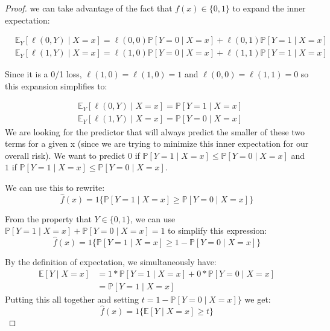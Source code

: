 \begin{proof}


 we can take advantage of the fact that $f(x) \in \{0, 1\}$ to expand the inner expectation:


$$\begin{aligned}
&\mathbb{E}_Y[\ell(0, Y) \mid X=x]=\ell(0,0) \mathbb{P}[Y=0 \mid X=x]+\ell(0,1) \mathbb{P}[Y=1 \mid X=x] \\
&\mathbb{E}_Y[\ell(1, Y) \mid X=x]=\ell(1,0) \mathbb{P}[Y=0 \mid X=x]+\ell(1,1) \mathbb{P}[Y=1 \mid X=x]
\end{aligned}
$$

\noindent
Since it is a 0/1 loss, $\ell(1,0) = \ell(1,0) = 1$ and $\ell(0,0) = \ell(1,1) = 0$ so this expansion simplifies to:

$$\begin{aligned}
&\mathbb{E}_Y[\ell(0, Y) \mid X=x]= \mathbb{P}[Y=1 \mid X=x] \\
&\mathbb{E}_Y[\ell(1, Y) \mid X=x]=\mathbb{P}[Y=0 \mid X=x]
\end{aligned}
$$
We are looking for the predictor that will always predict the smaller of these two terms for a given x (since we are trying to minimize this inner expectation for our overall risk). We want to predict $0$ if $\mathbb{P}[Y=1 \mid X=x] \leq \mathbb{P}[Y=0 \mid X=x]$ and $1$ if $\mathbb{P}[Y=1 \mid X=x] \leq \mathbb{P}[Y=0 \mid X=x]$.

\noindent
We can use this to rewrite:
$$\hat{f}(x) = 1\{\mathbb{P}[Y=1 \mid X=x] \geq \mathbb{P}[Y=0 \mid X=x]\}$$

\noindent
From the property that $Y \in \{0, 1\}$, we can use $\mathbb{P}[Y=1 \mid X=x] + \mathbb{P}[Y=0 \mid X=x] = 1$ to simplify this expression:
$$\hat{f}(x) = 1\{\mathbb{P}[Y=1 \mid X=x] \geq 1 - \mathbb{P}[Y=0 \mid X=x]\}$$ 

\noindent
By the definition of expectation, we simultaneously have:
\begin{align*}
\mathbb{E}[Y \mid X = x] &= 1*\mathbb{P}[Y=1 \mid X=x] + 0*\mathbb{P}[Y=0 \mid X=x] \\
&= \mathbb{P}[Y=1 \mid X=x]
\end{align*}
Putting this all together and setting $t = 1 - \mathbb{P}[Y=0 \mid X=x]\}$ we get:
$$\hat{f}(x) = 1\{\mathbb{E}[Y \mid X = x] \geq t \}$$
\end{proof}


